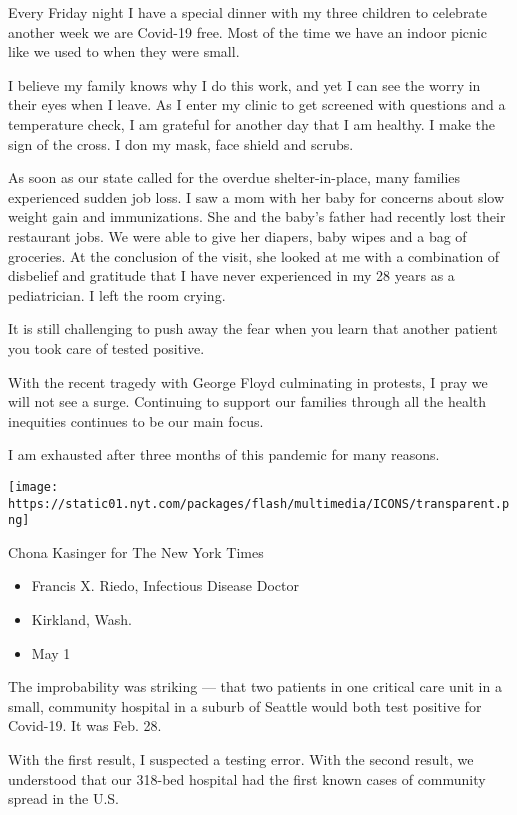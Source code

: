 Every Friday night I have a special dinner with my three children to
celebrate another week we are Covid-19 free. Most of the time we have an
indoor picnic like we used to when they were small.

I believe my family knows why I do this work, and yet I can see the
worry in their eyes when I leave. As I enter my clinic to get screened
with questions and a temperature check, I am grateful for another day
that I am healthy. I make the sign of the cross. I don my mask, face
shield and scrubs.

As soon as our state called for the overdue shelter-in-place, many
families experienced sudden job loss. I saw a mom with her baby for
concerns about slow weight gain and immunizations. She and the baby's
father had recently lost their restaurant jobs. We were able to give her
diapers, baby wipes and a bag of groceries. At the conclusion of the
visit, she looked at me with a combination of disbelief and gratitude
that I have never experienced in my 28 years as a pediatrician. I left
the room crying.

It is still challenging to push away the fear when you learn that
another patient you took care of tested positive.

With the recent tragedy with George Floyd culminating in protests, I
pray we will not see a surge. Continuing to support our families through
all the health inequities continues to be our main focus.

I am exhausted after three months of this pandemic for many reasons.

\texttt{[image: https://static01.nyt.com/packages/flash/multimedia/ICONS/transparent.png]}

Chona Kasinger for The New York Times

\begin{itemize}
\tightlist
\item
  Francis X. Riedo, Infectious Disease Doctor
\item
  Kirkland, Wash.
\item
  May 1
\end{itemize}

The improbability was striking --- that two patients in one critical
care unit in a small, community hospital in a suburb of Seattle would
both test positive for Covid-19. It was Feb. 28.

With the first result, I suspected a testing error. With the second
result, we understood that our 318-bed hospital had the first known
cases of community spread in the U.S.


